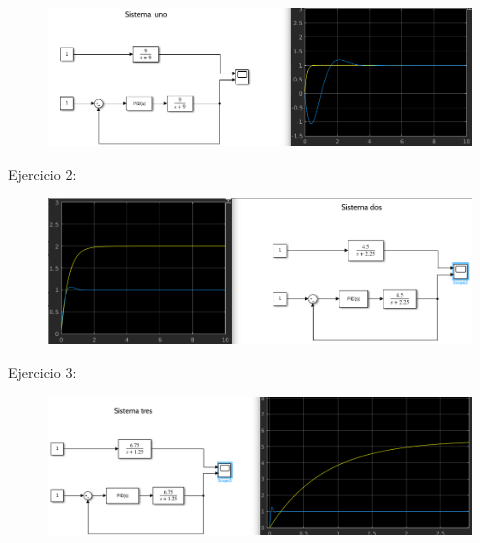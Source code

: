 \documentclass[12pt,letterpaper]{article}
\begin{document}
\begin{center}

\begin{figure}[h!]
\begin{floatrow}
\centering
\includegraphics[width=15cm]{sim1.png}
\label{fig:tubes}
\end{floatrow}
\end{figure}\hfill \break 

\end{center}\hfill \break 


Ejercicio 2: 

\begin{center}

\begin{figure}[h!]
\begin{floatrow}
\centering
\includegraphics[width=13.1cm]{sim2.png}
\label{fig:tubes}
\end{floatrow}
\end{figure} 
\end{center}


Ejercicio 3: 

\begin{center}

\begin{figure}[h!]
\begin{floatrow}
\centering
\includegraphics[width=13.1cm]{sim3.png}
\label{fig:tubes}
\end{floatrow}
\end{figure} 
\end{center}
\end{document}
